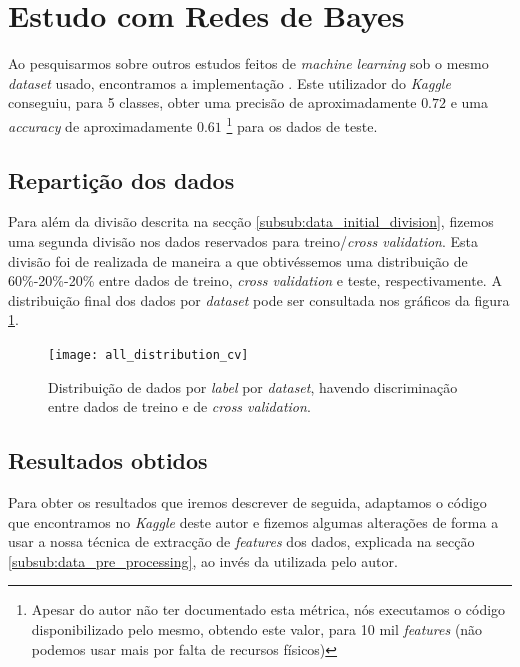 \section{Estudo com Redes de Bayes}
\label{sec:bayes}

Ao pesquisarmos sobre outros estudos feitos de \textit{machine learning} sob o mesmo \textit{dataset} usado, encontramos a implementação \cite{kaggle_bayes}. Este utilizador do \textit{Kaggle} conseguiu, para 5 classes, obter uma precisão de aproximadamente $0.72$ e uma \textit{accuracy} de aproximadamente $0.61$ \footnote{Apesar do autor não ter documentado esta métrica, nós executamos o código disponibilizado pelo mesmo, obtendo este valor, para 10 mil \textit{features} (não podemos usar mais por falta de recursos físicos)} para os dados de teste.


\subsection{Repartição dos dados}
\label{subsub:bayes_data}

Para além da divisão descrita na secção \ref{subsub:data_initial_division}, fizemos uma segunda divisão nos dados reservados para treino/\textit{cross validation}. Esta divisão foi de realizada de maneira a que obtivéssemos uma distribuição de 60\%-20\%-20\% entre dados de treino, \textit{cross validation} e teste, respectivamente. A distribuição final dos dados por \textit{dataset} pode ser consultada nos gráficos da figura \ref{fig:data_distribution_with_cv}.

\begin{figure}[!t]
	\centering
	\texttt{[image: all\_distribution\_cv]}
	\caption{Distribuição de dados por \textit{label} por \textit{dataset}, havendo discriminação entre dados de treino e de \textit{cross validation}.}
	\label{fig:data_distribution_with_cv}
\end{figure}


\subsection{Resultados obtidos}
\label{sub:results_bayes}

Para obter os resultados que iremos descrever de seguida, adaptamos o código que encontramos no \textit{Kaggle} deste autor e fizemos algumas alterações de forma a usar a nossa técnica de extracção de \textit{features} dos dados, explicada na secção \ref{subsub:data_pre_processing}, ao invés da utilizada pelo autor. 

